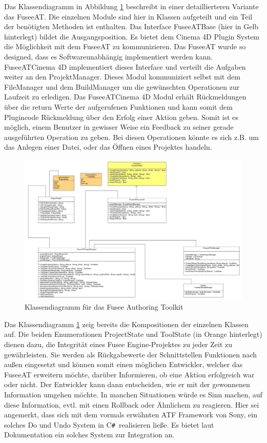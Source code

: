 \documentclass[pagesize, paper=a4, fontsize=12pt, titlepage=true, headings=small, headnosepline, abstractoff, liststotoc, nochapterprefix, plainheadsepline, twoside]{scrreprt}
\newcommand{\CSS}{C\texttt{\# }}
\begin{document}
Das Klassendiagramm in Abbildung \ref{FuseeATKlassendiagramm} beschreibt in einer detaillierteren Variante das FuseeAT. Die einzelnen Module sind hier in Klassen aufgeteilt und ein Teil der benötigten Methoden ist enthalten. Das Interface FuseeATBase (hier in Gelb hinterlegt) bildet die Ausgangsposition. Es bietet dem Cinema 4D Plugin System die Möglichkeit mit dem FuseeAT zu kommunizieren. Das FuseeAT wurde so designed, dass es Softwareunabhängig implementiert werden kann. FuseeATCinema 4D implementiert dieses Interface und verteilt die Aufgaben weiter an den ProjektManager. Dieses Modul kommuniziert selbst mit dem FileManager und dem BuildManager um die gewünschten Operationen zur Laufzeit zu erledigen. Das FuseeATCinema 4D Modul erhält Rückmeldungen über die return Werte der aufgerufenen Funktionen und kann somit dem Plugincode Rückmeldung über den Erfolg einer Aktion geben. Somit ist es möglich, einem Benutzer in gewisser Weise ein Feedback zu seiner gerade ausgeführten Operation zu geben. Bei diesen Operationen könnte es sich z.B. um das Anlegen einer Datei, oder das Öffnen eines Projektes handeln.
\begin{figure}[ht]
	\centering
	\includegraphics[width=\linewidth]{Bilder/Klassendiagramm_FuseeAT.jpg}
	\caption{Klassendiagramm für das Fusee Authoring Toolkit}
	\label{FuseeATKlassendiagramm}
\end{figure}
Das Klassendiagramm \ref{FuseeATKlassendiagramm} zeig bereits die Kompositionen der einzelnen Klassen auf. Die beiden Enumerationen ProjectState und ToolState (in Orange hinterlegt) dienen dazu, die Integrität eines Fusee Engine-Projektes zu jeder Zeit zu gewährleisten. Sie werden als Rückgabewerte der Schnittstellen Funktionen nach außen eingesetzt und können somit einen möglichen Entwickler, welcher das FuseeAT erweitern möchte, darüber Informieren, ob eine Aktion erfolgreich war oder nicht. Der Entwickler kann dann entscheiden, wie er mit der gewonnenen Information umgehen möchte. In manchen Situationen würde es Sinn machen, auf diese Information, evtl. mit einen Rollback oder Ähnlichem zu reagieren. Hier sei angemerkt, dass sich mit dem vormals erwähnten ATF Framework von Sony, ein solches Do und Undo System in \CSS realisieren ließe. Es bietet laut Dokumentation ein solches System zur Integration an.
\end{document}
